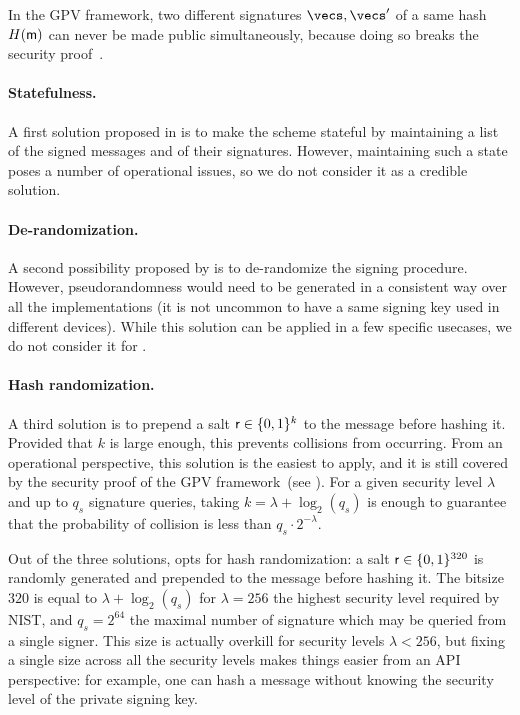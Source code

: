 In the GPV framework, two different signatures $\vecs, \vecs'$ of a same hash $H(\textsf{m})$ can never be made public simultaneously, because doing so breaks the security proof~\cite[Section 6.1]{STOC:GenPeiVai08}.

\paragraph{Statefulness.} A first solution proposed in \cite[Section 6.1]{STOC:GenPeiVai08} is to make the scheme stateful by maintaining a list of the signed messages and of their signatures. However, maintaining such a state poses a number of operational issues, so we do not consider it as a credible solution.

\paragraph{De-randomization.} A second possibility proposed by \cite{STOC:GenPeiVai08} is to de-randomize the signing procedure. However, pseudorandomness would need to be generated in a consistent way over all the implementations (it is not uncommon to have a same signing key used in different devices). While this solution can be applied in a few specific usecases, we do not consider it for \falcon.

\paragraph{Hash randomization.} A third solution is to prepend a salt $\textsf{r} \in \{0,1\}^{k}$ to the message \msg before hashing it. Provided that $k$ is large enough, this prevents collisions from occurring. From an operational perspective, this solution is the easiest to apply, and it is still covered by the security proof of the GPV framework~(see \cite[Section 6.2]{STOC:GenPeiVai08}). For a given security level $\lambda$ and up to $q_s$ signature queries, taking $k = \lambda + \log_2( q_s )$ is enough to guarantee that the probability of collision is less than $q_s \cdot 2^{-\lambda}$. 

Out of the three solutions, \falcon opts for hash randomization: a salt $\textsf{r} \in \{0,1\}^{320}$ is randomly generated and prepended to the message before hashing it. The bitsize $320$ is equal to $\lambda + \log_2( q_s )$ for $\lambda = 256$ the highest security level required by NIST, and $q_s = 2^{64}$ the maximal number of signature which may be queried from a single signer. This size is actually overkill for security levels $ \lambda < 256$, but fixing a single size across all the security levels makes things easier from an API perspective: for example, one can hash a message without knowing the security level of the private signing key.


